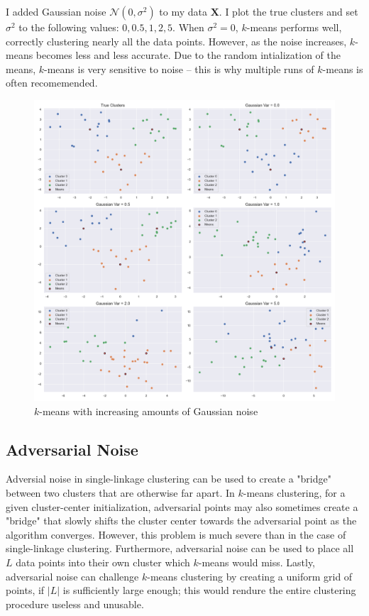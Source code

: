 \documentclass{article}
\begin{document}
        I added Gaussian noise $\mathcal{N}(0, \sigma^2)$ to my data $\mathbf{X}$. I plot the true clusters and set $\sigma^2$ to the following values: $0, 0.5, 1, 2, 5$. When $\sigma^2=0$, $k$-means performs well, correctly clustering nearly all the data points. However, as the noise increases, $k$-means becomes less and less accurate. Due to the random intialization of the means, $k$-means is very sensitive to noise -- this is why multiple runs of $k$-means is often recomemended.
        
        \begin{figure}[ht]
            \label{fig:kmeans_gaussian_noise}
                \includegraphics[width=0.99\linewidth]{images/q2/gaussian_noise.png}
                \caption{$k$-means with increasing amounts of Gaussian noise}
            \end{figure}
            \pagebreak

    \subsection[short]{Adversarial Noise}

        Adversial noise in single-linkage clustering can be used to create a "bridge" between two clusters that are otherwise far apart. In $k$-means clustering, for a given cluster-center initialization, adversarial points may also sometimes create a "bridge" that slowly shifts the cluster center towards the adversarial point as the algorithm converges. However, this problem is much severe than in the case of single-linkage clustering. Furthermore, adversarial noise can be used to place all $L$ data points into their own cluster which $k$-means would miss. Lastly, adversarial noise can challenge $k$-means clustering by creating a uniform grid of points, if $|L|$ is sufficiently large enough; this would rendure the entire clustering procedure useless and unusable.
\end{document}
